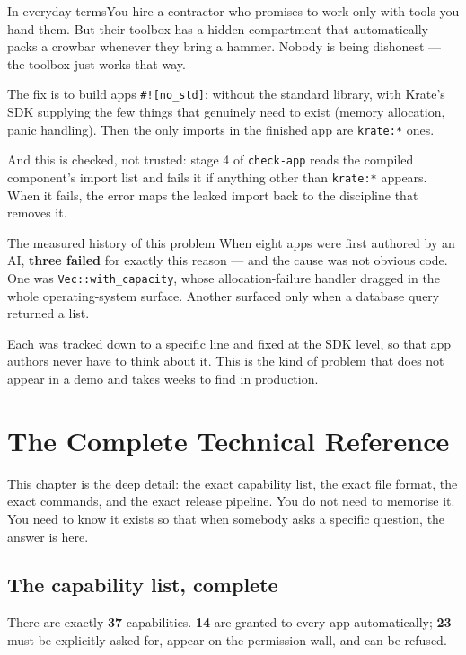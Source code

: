 \documentclass[11pt,a4paper]{report}
\newcommand{\analogy}[1]{\begin{plainbox}{In everyday terms}#1\end{plainbox}}
\begin{document}
\analogy{You hire a contractor who promises to work only with tools you
hand them. But their toolbox has a hidden compartment that automatically
packs a crowbar whenever they bring a hammer. Nobody is being dishonest ---
the toolbox just works that way.}

The fix is to build apps \texttt{\#![no\_std]}: without the standard
library, with Krate's SDK supplying the few things that genuinely need to
exist (memory allocation, panic handling). Then the only imports in the
finished app are \texttt{krate:*} ones.

And this is checked, not trusted: stage 4 of \texttt{check-app} reads the
compiled component's import list and fails it if anything other than
\texttt{krate:*} appears. When it fails, the error maps the leaked import
back to the discipline that removes it.

\begin{factbox}{The measured history of this problem}
When eight apps were first authored by an AI, \textbf{three failed} for
exactly this reason --- and the cause was not obvious code. One was
\texttt{Vec::with\_capacity}, whose allocation-failure handler dragged in
the whole operating-system surface. Another surfaced only when a database
query returned a list.

Each was tracked down to a specific line and fixed at the SDK level, so
that app authors never have to think about it. This is the kind of problem
that does not appear in a demo and takes weeks to find in production.
\end{factbox}

\chapter{The Complete Technical Reference}

This chapter is the deep detail: the exact capability list, the exact file
format, the exact commands, and the exact release pipeline. You do not need
to memorise it. You need to know it exists so that when somebody asks a
specific question, the answer is here.

\section{The capability list, complete}

There are exactly \textbf{37} capabilities. \textbf{14} are granted to every
app automatically; \textbf{23} must be explicitly asked for, appear on the
permission wall, and can be refused.
\end{document}
